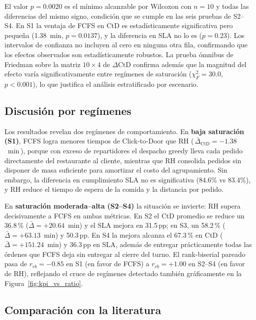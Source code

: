 \documentclass[12pt,letterpaper,oneside]{book}
\begin{document}
	El valor $p = 0{.}0020$ es el mínimo alcanzable por Wilcoxon con
	$n=10$ y todas las diferencias del mismo signo, condición que se
	cumple en las seis pruebas de S2--S4.  En S1 la ventaja de FCFS en CtD es
	estadísticamente significativa pero pequeña (1.38~min, $p = 0{.}0137$), y la
	diferencia en SLA no lo es ($p = 0{.}23$).  Los intervalos de confianza no incluyen
	al cero en ninguna otra fila, confirmando que los efectos observados son
	estadísticamente robustos.  La prueba ómnibus de Friedman sobre la
	matriz $10 \times 4$ de $\Delta\text{CtD}$ confirma además que la
	magnitud del efecto varía significativamente entre regímenes de
	saturación ($\chi^2_F = 30{.}0$, $p < 0{.}001$), lo que justifica el
	análisis estratificado por escenario.

	\subsection{Discusión por regímenes}
	\label{sec:discusion_regimenes}

	Los resultados revelan dos regímenes de comportamiento.  En
	\textbf{baja saturación (S1)}, FCFS logra menores tiempos de
	Click-to-Door que RH (\,$\bar{\Delta}_{\text{CtD}} = -1{.}38$~min\,),
	porque con exceso de repartidores el
	despacho greedy lleva cada pedido directamente del restaurante al
	cliente, mientras que RH consolida pedidos
	sin disponer de masa suficiente para amortizar el costo
	del agrupamiento.  Sin embargo, la diferencia en cumplimiento
	SLA no es significativa (84.6\% vs 83.4\%), y RH reduce el tiempo de
	espera de la comida y la distancia por pedido.

	En \textbf{saturación moderada--alta (S2--S4)} la situación se invierte:
	RH supera decisivamente a FCFS en ambas métricas.  En S2 el CtD
	promedio se reduce un 36.8\,\% ($\bar{\Delta} = +20{.}64$~min) y el
	SLA mejora en 31.5\,pp; en S3, un 58.2\,\% ($\bar{\Delta} = +63{.}13$~min) y
	50.3\,pp.  En S4 la mejora alcanza el 67.3\,\% en CtD
	($\bar{\Delta} = +151{.}24$~min) y 36.3\,pp en SLA, además de entregar
	prácticamente todas las órdenes que FCFS deja sin entregar al cierre del
	turno.  El rank-biserial pareado pasa de $r_{rb} = -0{.}85$ en S1 (en
	favor de FCFS) a $r_{rb} = +1{.}00$ en S2--S4 (en favor de RH), reflejando
	el cruce de regímenes detectado también gráficamente en la
	Figura~\ref{fig:kpi_vs_ratio}.

	\subsection{Comparación con la literatura}
	\label{sec:comparacion_literatura}
\end{document}
